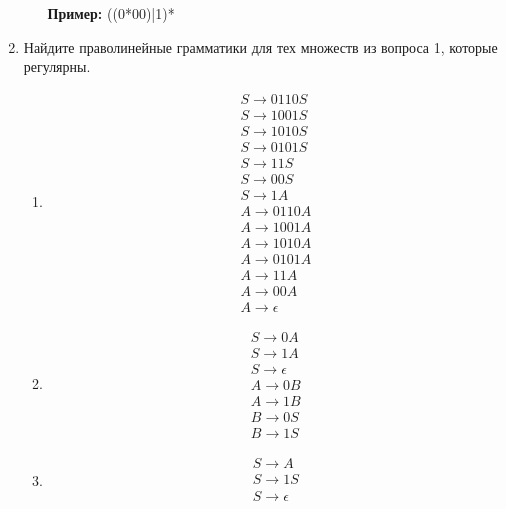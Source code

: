 \documentclass{bmstu}
\begin{document}
\begin{enumerate}
\begin{enumerate}
        \textbf{Пример:} ((0*00)|1)*
    \end{enumerate}
    \item Найдите праволинейные грамматики для тех множеств из вопроса 1, которые регулярны.
    \begin{enumerate}
        \item \begin{equation}
            \begin{split}
                S \to 0110S \\
                S \to 1001S \\
                S \to 1010S \\
                S \to 0101S \\
                S \to 11S \\
                S \to 00S \\
                S \to 1A \\
                A \to 0110A \\
                A \to 1001A \\
                A \to 1010A \\
                A \to 0101A \\
                A \to 11A \\
                A \to 00A \\
                A \to \epsilon
            \end{split}
        \end{equation}
        \item \begin{equation}
            \begin{split}
                S \to 0A \\
                S \to 1A \\
                S \to \epsilon \\
                A \to 0B \\
                A \to 1B \\
                B \to 0S \\
                B \to 1S
            \end{split}
        \end{equation}
        \item \begin{equation}
            \begin{split}
                S \to A \\
                S \to 1S \\
                S \to \epsilon \\

\end{split}
\end{equation}
\end{enumerate}
\end{enumerate}
\end{document}
